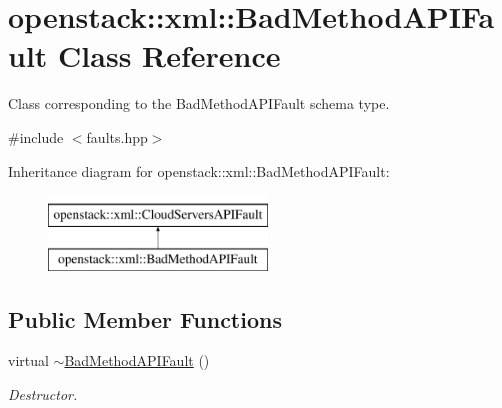 \hypertarget{classopenstack_1_1xml_1_1BadMethodAPIFault}{
\section{openstack::xml::BadMethodAPIFault Class Reference}
\label{classopenstack_1_1xml_1_1BadMethodAPIFault}
}


Class corresponding to the BadMethodAPIFault schema type.  




{\ttfamily \#include $<$faults.hpp$>$}

Inheritance diagram for openstack::xml::BadMethodAPIFault:\begin{figure}[H]
\begin{center}
\leavevmode
\includegraphics[height=2.000000cm]{classopenstack_1_1xml_1_1BadMethodAPIFault}
\end{center}
\end{figure}
\subsection*{Public Member Functions}
\begin{DoxyCompactItemize}
\item 
\hypertarget{classopenstack_1_1xml_1_1BadMethodAPIFault_ac4f8efbc25433c195e2f8bd76288dc4e}{
virtual \hyperlink{classopenstack_1_1xml_1_1BadMethodAPIFault_ac4f8efbc25433c195e2f8bd76288dc4e}{$\sim$BadMethodAPIFault} ()}
\label{classopenstack_1_1xml_1_1BadMethodAPIFault_ac4f8efbc25433c195e2f8bd76288dc4e}

\begin{DoxyCompactList}\small\item\em Destructor. \item\end{DoxyCompactList}\end{DoxyCompactItemize}

